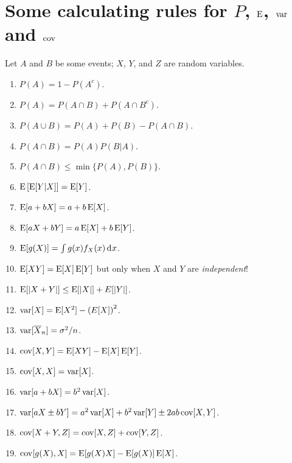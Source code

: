 \documentclass[twoside]{article}
\begin{document}
\section{Some calculating rules for $P$, $\operatorname{E}$, $\operatorname{var}$ and $\operatorname{cov}$}
Let $A$ and $B$ be some events; $X$, $Y$, and $Z$ are random variables.
\begin{enumerate}
\item $P(A) = 1 - P(A^c)$.
\item $P(A) = P(A\cap B) + P(A\cap B^c)$.
\item $P(A\cup B) = P(A) + P(B) - P(A\cap B)$.
\item $P(A \cap B) = P(A)P(B|A)$.
\item $P(A\cap B) \leq \min\{P(A), P(B)\}$.
\item $\operatorname{E}\left[\operatorname{E}[Y|X]\right] = \operatorname{E}[Y]$.
\item $\operatorname{E}[a + bX ] = a + b\operatorname{E}[X]$.
\item $\operatorname{E}[a X + b Y] = a\operatorname{E}[X] + b\operatorname{E}[Y]$.
\item $\E[g(X)] = \int g(x) f_X(x) \rd x$.
\item $\operatorname{E}[XY] = \operatorname{E}[X]\operatorname{E}[Y]$ but only when $X$ and $Y$ are \emph{independent}!
\item $\operatorname{E}[|X+Y|] \leq \operatorname{E}[|X|] + E[|Y|]$.
\item $\operatorname{var}[X] = \operatorname{E}[X^2] - \left(E[X]\right)^2$.
\item $\operatorname{var}[\overline{X}_n] = \sigma^2 / n$.
\item $\operatorname{cov}[X,Y] = \operatorname{E}[XY] - \operatorname{E}[X]\operatorname{E}[Y]$.
\item $\operatorname{cov}[X,X] = \operatorname{var}[X]$.
\item $\operatorname{var}[a + bX] = b^2 \operatorname{var}[X]$.
\item $\operatorname{var}[a X \pm b Y] = a^2 \operatorname{var}[X] + b^2 \operatorname{var}[Y] \pm 2 a b \operatorname{cov}[X,Y]$.
\item $\operatorname{cov}[X+Y,Z] =  \operatorname{cov}[X,Z] + \operatorname{cov}[Y,Z]$.
\item $\operatorname{cov}[g(X),X] = \operatorname{E}[g(X)X]  - \operatorname{E}[g(X)]\operatorname{E}[X]$.
\end{enumerate}

\newpage
{}



\clearpage
\end{document}
